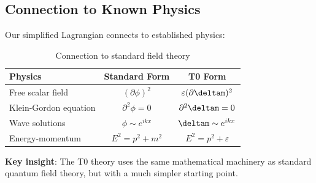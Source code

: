 	\subsection{Connection to Known Physics}
	
	Our simplified Lagrangian connects to established physics:
	
	\begin{table}[htbp]
		\centering
		\begin{tabular}{lcc}
			\toprule
			\textbf{Physics} & \textbf{Standard Form} & \textbf{T0 Form} \\
			\midrule
			Free scalar field & $(\partial \phi)^2$ & $\varepsilon(\partial \deltam)^2$ \\
			Klein-Gordon equation & $\partial^2 \phi = 0$ & $\partial^2 \deltam = 0$ \\
			Wave solutions & $\phi \sim e^{ikx}$ & $\deltam \sim e^{ikx}$ \\
			Energy-momentum & $E^2 = p^2 + m^2$ & $E^2 = p^2 + \varepsilon$ \\
			\bottomrule
		\end{tabular}
		\caption{Connection to standard field theory}
		\label{tab:standard_connection}
	\end{table}
	
	\textbf{Key insight}: The T0 theory uses the same mathematical machinery as standard quantum field theory, but with a much simpler starting point.
